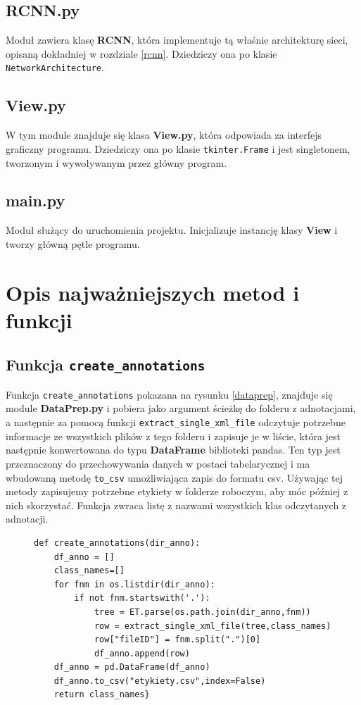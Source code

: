 \documentclass[a4paper,twoside,12pt]{book}
\begin{document}
{\subsection{RCNN.py}
{Moduł zawiera klasę \textbf{RCNN}, która implementuje tą właśnie architekturę sieci, opisaną dokładniej w rozdziale \ref{rcnn}. Dziedziczy ona po klasie \lstinline|NetworkArchitecture|.}
\subsection{View.py}
{W tym module znajduje się klasa \textbf{View.py}, która odpowiada za interfejs graficzny programu. Dziedziczy ona po klasie \lstinline|tkinter.Frame| i jest singletonem, tworzonym i wywoływanym przez główny program.}
\subsection{main.py}
{Moduł służący do uruchomienia projektu. Inicjalizuje instancję klasy \textbf{View} i tworzy główną pętle programu.}

\section{Opis najważniejszych metod i funkcji}
\subsection{Funkcja \lstinline|create_annotations|}
{ Funkcja \lstinline|create_annotations| pokazana na rysunku \ref{dataprep}, znajduje się module \textbf{DataPrep.py} i pobiera jako argument ścieżkę do folderu z adnotacjami, a następnie za pomocą funkcji \lstinline|extract_single_xml_file| odczytuje potrzebne informacje ze wszystkich plików z tego folderu  i zapisuje je w liście, która jest następnie konwertowana do typu \textbf{DataFrame} biblioteki pandas. Ten typ jest przeznaczony do przechowywania danych w postaci tabelarycznej i ma wbudowaną metodę \lstinline|to_csv| umożliwiająca zapis do formatu csv. Używając tej metody zapisujemy potrzebne etykiety w folderze roboczym, aby móc później z nich skorzystać. Funkcja zwraca listę z nazwami wszystkich klas odczytanych z adnotacji.}
\begin{figure}[h!]
\centering
\begin{lstlisting}
def create_annotations(dir_anno):
    df_anno = []
    class_names=[]
    for fnm in os.listdir(dir_anno):  
        if not fnm.startswith('.'):
            tree = ET.parse(os.path.join(dir_anno,fnm))
            row = extract_single_xml_file(tree,class_names)
            row["fileID"] = fnm.split(".")[0]
            df_anno.append(row)
    df_anno = pd.DataFrame(df_anno)
    df_anno.to_csv("etykiety.csv",index=False)
    return class_names}


\end{lstlisting}
\end{figure}}
\end{document}
